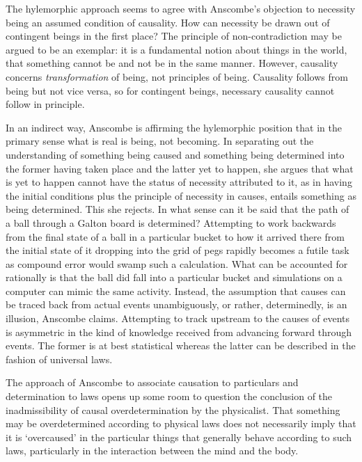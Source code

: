 The hylemorphic approach seems to agree with Anscombe's objection to necessity being an assumed condition of causality. How can necessity be drawn out of contingent beings in the first place? The principle of non-contradiction may be argued to be an exemplar: it is a fundamental notion about things in the world, that something cannot be and not be in the same manner. However, causality concerns \emph{transformation} of being, not principles of being. Causality follows from being but not vice versa, so for contingent beings, necessary causality cannot follow in principle.

In an indirect way, Anscombe is affirming the hylemorphic position that in the primary sense what is real is being, not becoming. In separating out the understanding of something being caused and something being determined into the former having taken place and the latter yet to happen, she argues that what is yet to happen cannot have the status of necessity attributed to it, as in having the initial conditions plus the principle of necessity in causes, entails something as being determined. This she rejects. In what sense can it be said that the path of a ball through a Galton board is determined? Attempting to work backwards from the final state of a ball in a particular bucket to how it arrived there from the initial state of it dropping into the grid of pegs rapidly becomes a futile task as compound error would swamp such a calculation. What can be accounted for rationally is that the ball did fall into a particular bucket and simulations on a computer can mimic the same activity. Instead, the assumption that causes can be traced back from actual events unambiguously, or rather, determinedly, is an illusion, Anscombe claims. Attempting to track upstream to the causes of events is asymmetric in the kind of knowledge received from advancing forward through events. The former is at best statistical whereas the latter can be described in the fashion of universal laws.

The approach of Anscombe to associate causation to particulars and determination to laws opens up some room to question the conclusion of the inadmissibility of causal overdetermination by the physicalist. That something may be overdetermined according to physical laws does not necessarily imply that it is `overcaused' in the particular things that generally behave according to such laws, particularly in the interaction between the mind and the body.

